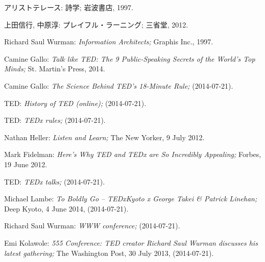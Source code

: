 \documentclass[submit,techreq,jkeyword,noauthor]{ipsj}
\begin{document}
\begin{thebibliography}{10}

アリストテレース: 詩学; 岩波書店, 1997.

上田信行, 中原淳: プレイフル・ラーニング; 三省堂, 2012.

Richard Saul Wurman: \textit{Information Architects;}
Graphis Inc., 1997.

Camine Gallo: \textit{Talk like TED: The 9 Public-Speaking Secrets of the World's Top Minds;}
St. Martin's Press, 2014.

Camine Gallo: \textit{The Science Behind TED's 18-Minute Rule;}
(2014-07-21).

TED: \textit{History of TED (online);}
 (2014-07-21).

TED: \textit{TEDx rules;}
(2014-07-21).

Nathan Heller: \textit{Listen and Learn;}
The New Yorker, 9 July 2012.

Mark Fidelman: \textit{Here's Why TED and TEDx are So Incredibly Appealing;}
Forbes, 19 June 2012.

TED: \textit{TEDx talks;}
(2014-07-21).

Michael Lambe: \textit{To Boldly Go – TEDxKyoto x George Takei \& Patrick Linehan;}
Deep Kyoto, 4 June 2014,
 (2014-07-21).

Richard Saul Wurman: \textit{WWW conference;}
 (2014-07-21).

Emi Kolawole: \textit{555 Conference: TED creator Richard Saul Wurman discusses his latest gathering;}
The Washington Post, 30 July 2013,
(2014-07-21).

\end{thebibliography}





\begin{biography}
%
%
%
\end{biography}
\end{document}
